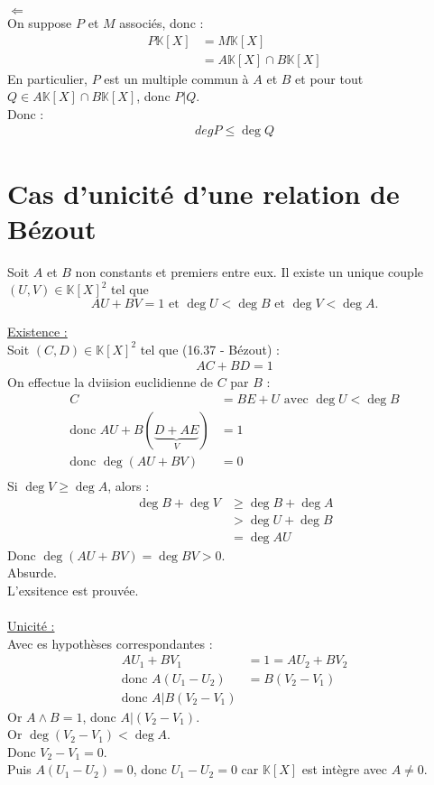 \documentclass[../main.tex]{subfiles}
\begin{document}
$\boxed{\Leftarrow}$ \\
On suppose $P$ et $M$ associés, donc : 
\begin{align*}
    P \mathbb{K}[X] &= M \mathbb{K}[X] \\
    &= A \mathbb{K}[X] \cap B \mathbb{K}[X]
\end{align*}
En particulier, $P$ est un multiple commun à $A$ et $B$ et pour tout $Q \in A \mathbb{K}[X] \cap B \mathbb{K}[X]$, donc $P|Q$. \\
Donc : 
\begin{align*}
    \boxed{deg P \leq \deg Q}
\end{align*}

\section{Cas d'unicité d'une relation de Bézout}
\begin{tcolorbox}[title=Propostion 16.42, title filled=false, colframe=lightblue, colback=lightblue!10!white]
    Soit $A$ et $B$ non constants et premiers entre eux. Il existe un unique couple $(U, V) \in \mathbb{K}[X]^2$ tel que
    $$AU + BV = 1 \text{ et } \deg U < \deg B \text{ et } \deg V < \deg A.$$
\end{tcolorbox}

\noindent \underline{Existence :} \\
Soit $(C, D) \in \mathbb{K}[X]^2$ tel que (16.37 - Bézout) :
\begin{align*}
    AC + BD = 1
\end{align*}
On effectue la dviision euclidienne de $C$ par $B$ :
\begin{align*}
    C &= BE + U \text{ avec } \deg U < \deg B \\
    \text{donc } AU + B(\underbrace{D + AE}_{V}) &= 1 \\
    \text{donc } \deg (AU + BV) &= 0 \\
\end{align*}
Si $\deg V \geq \deg A$, alors :
\begin{align*}
    \deg B + \deg V &\geq \deg B + \deg A \\
    &> \deg U + \deg B \\
    &= \deg AU
\end{align*}
Donc $\deg (AU + BV) = \deg BV > 0$. \\
Absurde. \\
L'exsitence est prouvée. \\ \\

\noindent \underline{Unicité :} \\
Avec es hypothèses correspondantes : 
\begin{align*}
    AU_1 + BV_1 &= 1 = AU_2 + BV_2 \\
    \text{donc } A(U_1 - U_2) &= B(V_2 - V_1) \\
    \text{donc } A | B(V_2 - V_1)
\end{align*}
Or $A \wedge B = 1$, donc $A | (V_2 - V_1)$. \\
Or $\deg (V_2 - V_1) < \deg A$. \\
Donc $V_2 - V_1 = 0$. \\
Puis $A(U_1 - U_2) = 0$, donc $U_1 - U_2 = 0$ car $\mathbb{K}[X]$ est intègre avec $A \neq 0$.
\end{document}
